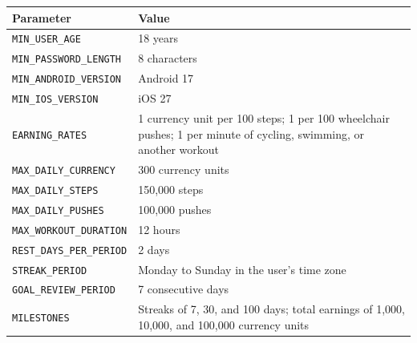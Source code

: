 \documentclass[12pt, titlepage]{article}
\begin{document}
\begin{center}
\begin{tabular}{p{} p{}}
\hline
\textbf{Parameter} & \textbf{Value} \\
\hline

\texttt{MIN\_USER\_AGE} & 18 years \\[6pt]

\texttt{MIN\_PASSWORD\_LENGTH} & 8 characters \\[6pt]

\texttt{MIN\_ANDROID\_VERSION} & Android 17 \\[6pt]

\texttt{MIN\_IOS\_VERSION} & iOS 27 \\[6pt]

\texttt{EARNING\_RATES} &
1 currency unit per 100 steps; 1 per 100 wheelchair pushes;
1 per minute of cycling, swimming, or another workout \\[6pt]

\texttt{MAX\_DAILY\_CURRENCY} & 300 currency units \\[6pt]

\texttt{MAX\_DAILY\_STEPS} & 150,000 steps \\[6pt]

\texttt{MAX\_DAILY\_PUSHES} & 100,000 pushes \\[6pt]

\texttt{MAX\_WORKOUT\_DURATION} & 12 hours \\[6pt]

\texttt{REST\_DAYS\_PER\_PERIOD} & 2 days \\[6pt]

\texttt{STREAK\_PERIOD} &
Monday to Sunday in the user's time zone \\[6pt]

\texttt{GOAL\_REVIEW\_PERIOD} & 7 consecutive days \\[6pt]

\texttt{MILESTONES} &
Streaks of 7, 30, and 100 days; total earnings of 1,000,
10,000, and 100,000 currency units \\

\hline
\end{tabular}
\end{center}
\end{document}
